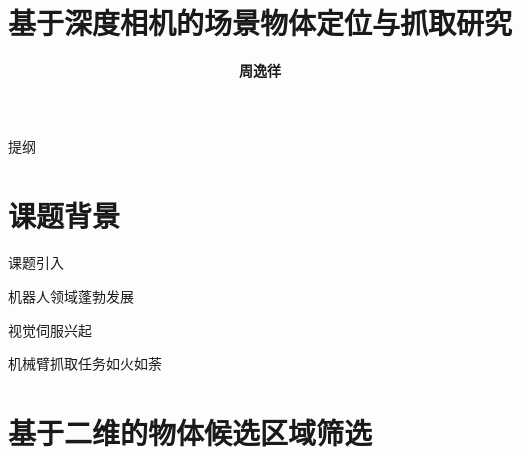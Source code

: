 \documentclass[xcolor=table,compress,blue]{beamer}
\title{\textbf{\Huge{基于深度相机的场景物体定位与抓取研究}}}
\institute{ 
	\textbf{\large{南京大学计算机科学与技术系}}
}
\author{\textbf{\huge{周逸徉}}}
\date{\tiny{}}
\begin{document}
\frame{
	\titlepage
	\thispagestyle{empty}
}
\begin{frame}[plain]{提纲}
	\vspace{-16pt}
	\textbf{\Large{\tableofcontents[hideallsubsections]}}
\end{frame}


%

\section{课题背景}
	\begin{frame}{课题引入}
		\begin{exampleblock}{机器人领域蓬勃发展}
			
		\end{exampleblock}
		\begin{exampleblock}{视觉伺服兴起}
			
		\end{exampleblock}
		\begin{exampleblock}{机械臂抓取任务如火如荼}
			
		\end{exampleblock}
	\end{frame}

\section{基于二维的物体候选区域筛选}
\end{document}
